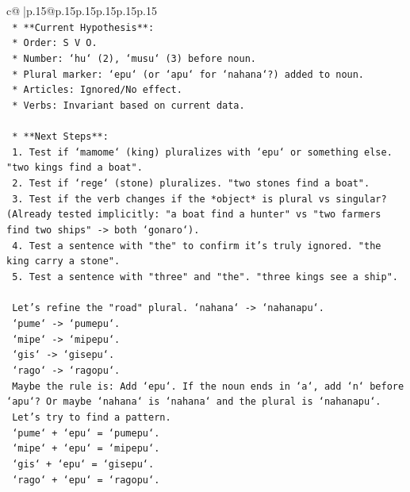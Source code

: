 \documentclass{article}
\begin{document}
{\begin{supertabular}{c@{$\;$}|p{.15\linewidth}@{}p{.15\linewidth}p{.15\linewidth}p{.15\linewidth}p{.15\linewidth}p{.15\linewidth}}
{{{\\ 
\texttt{    *   **Current Hypothesis**:} \\
\texttt{        *   Order: S V O.} \\
\texttt{        *   Number: `hu` (2), `musu` (3) before noun.} \\
\texttt{        *   Plural marker: `epu` (or `apu` for `nahana`?) added to noun.} \\
\texttt{        *   Articles: Ignored/No effect.} \\
\texttt{        *   Verbs: Invariant based on current data.} \\
\\ 
\texttt{    *   **Next Steps**:} \\
\texttt{        1.  Test if `mamome` (king) pluralizes with `epu` or something else. "two kings find a boat".} \\
\texttt{        2.  Test if `rege` (stone) pluralizes. "two stones find a boat".} \\
\texttt{        3.  Test if the verb changes if the *object* is plural vs singular? (Already tested implicitly: "a boat find a hunter" vs "two farmers find two ships" {-}> both `gonaro`).} \\
\texttt{        4.  Test a sentence with "the" to confirm it's truly ignored. "the king carry a stone".} \\
\texttt{        5.  Test a sentence with "three" and "the". "three kings see a ship".} \\
\\ 
\texttt{    Let's refine the "road" plural. `nahana` {-}> `nahanapu`.} \\
\texttt{    `pume` {-}> `pumepu`.} \\
\texttt{    `mipe` {-}> `mipepu`.} \\
\texttt{    `gis` {-}> `gisepu`.} \\
\texttt{    `rago` {-}> `ragopu`.} \\
\texttt{    Maybe the rule is: Add `epu`. If the noun ends in `a`, add `n` before `apu`? Or maybe `nahana` is `nahana` and the plural is `nahanapu`.} \\
\texttt{    Let's try to find a pattern.} \\
\texttt{    `pume` + `epu` = `pumepu`.} \\
\texttt{    `mipe` + `epu` = `mipepu`.} \\
\texttt{    `gis` + `epu` = `gisepu`.} \\
\texttt{    `rago` + `epu` = `ragopu`.} \\
}}}
\end{supertabular}}
\end{document}
